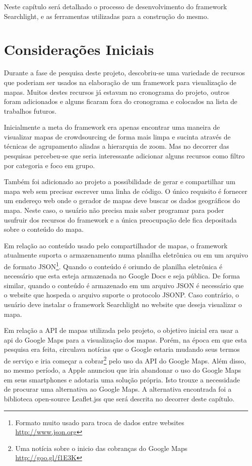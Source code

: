 Neste capítulo será detalhado o processo de desenvolvimento do framework Searchlight, e as ferramentas utilizadas para a construção do mesmo.

\section{Considerações Iniciais}
Durante  a fase de pesquisa deste projeto, descobriu-se uma variedade de recursos que poderiam ser usados na elaboração de um framework para visualização de mapas. Muitos destes recursos já estavam no cronograma do projeto, outros foram adicionados  e alguns ficaram fora do cronograma e colocados na lista de trabalhos futuros.

Inicialmente a meta do framework era apenas encontrar uma maneira de visualizar mapas de crowdsourcing de forma mais limpa e sucinta através de técnicas de agrupamento aliadas a hierarquia de zoom. Mas no decorrer das pesquisas percebeu-se que seria interessante adicionar alguns recursos como filtro por categoria e foco em grupo. 

Também foi adicionado ao projeto a possibilidade de gerar e compartilhar um mapa web sem precisar escrever uma linha de código.
O único requisito é fornecer um endereço web onde o gerador de mapas deve buscar os dados geográficos do mapa. Neste caso, o usuário não precisa mais saber programar para poder usufruir dos recursos do framework e a única preocupação dele fica depositada sobre o conteúdo do mapa.

Em relação ao conteúdo usado pelo compartilhador de mapas, o framework atualmente suporta o armazenamento numa planilha eletrônica ou em um arquivo de formato JSON\footnote{Formato muito usado para troca de dados entre websites \url{http://www.json.org}}. Quando o conteúdo é oriundo de planilha eletrônica é necessário que esta esteja armazenada no Google Docs e seja pública. De forma similar, quando o conteúdo é armazenado em um arquivo JSON é necessário que o website que hospeda o arquivo suporte o protocolo JSONP. Caso contrário, o usuário deve instalar o framework Searchlight no website que deseja visualizar o mapa.


Em relação a API de mapas utilizada pelo projeto, o objetivo inicial era usar a api do Google Maps para a visualização dos mapas. Porém,  na época em que esta pesquisa era feita, circulava notícias que o Google estaria mudando seus termos de serviço e iria começar a cobrar\footnote{Uma notícia sobre o inicio das cobranças do Google Maps \url{http://goo.gl/f1E3K}} pelo uso da API do Google Maps. Além disso, no mesmo período, a Apple anunciou que iria abandonar o uso do Google Maps em seus smartphones e adotaria uma solução própria. Isto trouxe a necessidade de procurar uma alternativa ao Google Maps. A alternativa encontrada foi a biblioteca open-source Leaflet.jss \cite{leaflet} que será descrita no decorrer deste capítulo.

